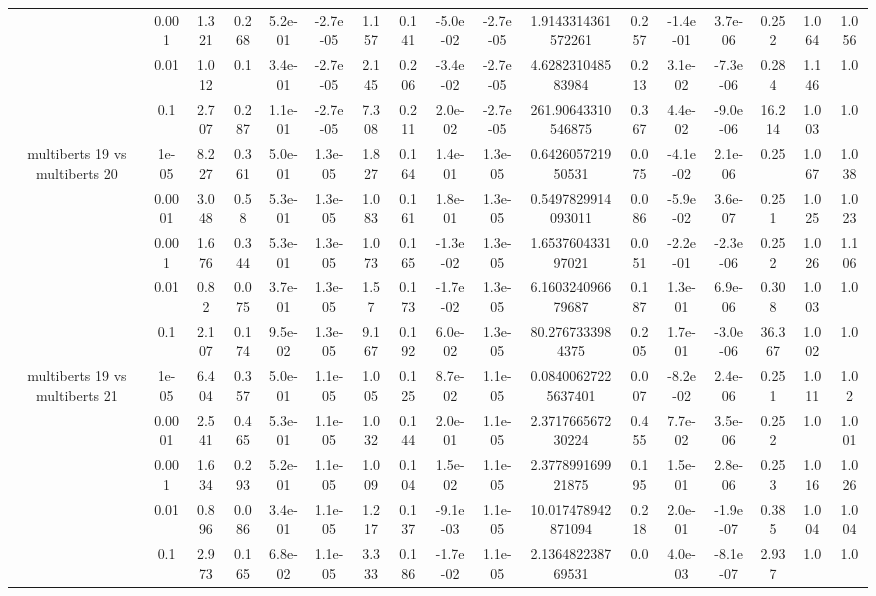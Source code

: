 \begin{tabular}{|c|c|c|c|c|c|c|c|c|c|c|c|c|c|c|c|c|}
 & 0.001 & 1.321 & 0.268 & 5.2e-01 & -2.7e-05 & 1.157 & 0.141 & -5.0e-02 & -2.7e-05 & 1.9143314361572261 & 0.257 & -1.4e-01 & 3.7e-06 & 0.252 & 1.064 & 1.056 \\
 & 0.01 & 1.012 & 0.1 & 3.4e-01 & -2.7e-05 & 2.145 & 0.206 & -3.4e-02 & -2.7e-05 & 4.628231048583984 & 0.213 & 3.1e-02 & -7.3e-06 & 0.284 & 1.146 & 1.0 \\
 & 0.1 & 2.707 & 0.287 & 1.1e-01 & -2.7e-05 & 7.308 & 0.211 & 2.0e-02 & -2.7e-05 & 261.90643310546875 & 0.367 & 4.4e-02 & -9.0e-06 & 16.214 & 1.003 & 1.0 \\
\hline
\multirow{5}{*}{multiberts 19 vs multiberts 20} & 1e-05 & 8.227 & 0.361 & 5.0e-01 & 1.3e-05 & 1.827 & 0.164 & 1.4e-01 & 1.3e-05 & 0.642605721950531 & 0.075 & -4.1e-02 & 2.1e-06 & 0.25 & 1.067 & 1.038 \\
 & 0.0001 & 3.048 & 0.58 & 5.3e-01 & 1.3e-05 & 1.083 & 0.161 & 1.8e-01 & 1.3e-05 & 0.5497829914093011 & 0.086 & -5.9e-02 & 3.6e-07 & 0.251 & 1.025 & 1.023 \\
 & 0.001 & 1.676 & 0.344 & 5.3e-01 & 1.3e-05 & 1.073 & 0.165 & -1.3e-02 & 1.3e-05 & 1.653760433197021 & 0.051 & -2.2e-01 & -2.3e-06 & 0.252 & 1.026 & 1.106 \\
 & 0.01 & 0.82 & 0.075 & 3.7e-01 & 1.3e-05 & 1.57 & 0.173 & -1.7e-02 & 1.3e-05 & 6.160324096679687 & 0.187 & 1.3e-01 & 6.9e-06 & 0.308 & 1.003 & 1.0 \\
 & 0.1 & 2.107 & 0.174 & 9.5e-02 & 1.3e-05 & 9.167 & 0.192 & 6.0e-02 & 1.3e-05 & 80.2767333984375 & 0.205 & 1.7e-01 & -3.0e-06 & 36.367 & 1.002 & 1.0 \\
\hline
\multirow{5}{*}{multiberts 19 vs multiberts 21} & 1e-05 & 6.404 & 0.357 & 5.0e-01 & 1.1e-05 & 1.005 & 0.125 & 8.7e-02 & 1.1e-05 & 0.08400627225637401 & 0.007 & -8.2e-02 & 2.4e-06 & 0.251 & 1.011 & 1.02 \\
 & 0.0001 & 2.541 & 0.465 & 5.3e-01 & 1.1e-05 & 1.032 & 0.144 & 2.0e-01 & 1.1e-05 & 2.371766567230224 & 0.455 & 7.7e-02 & 3.5e-06 & 0.252 & 1.0 & 1.001 \\
 & 0.001 & 1.634 & 0.293 & 5.2e-01 & 1.1e-05 & 1.009 & 0.104 & 1.5e-02 & 1.1e-05 & 2.377899169921875 & 0.195 & 1.5e-01 & 2.8e-06 & 0.253 & 1.016 & 1.026 \\
 & 0.01 & 0.896 & 0.086 & 3.4e-01 & 1.1e-05 & 1.217 & 0.137 & -9.1e-03 & 1.1e-05 & 10.017478942871094 & 0.218 & 2.0e-01 & -1.9e-07 & 0.385 & 1.004 & 1.004 \\
 & 0.1 & 2.973 & 0.165 & 6.8e-02 & 1.1e-05 & 3.333 & 0.186 & -1.7e-02 & 1.1e-05 & 2.136482238769531 & 0.0 & 4.0e-03 & -8.1e-07 & 2.937 & 1.0 & 1.0 \\

\end{tabular}
